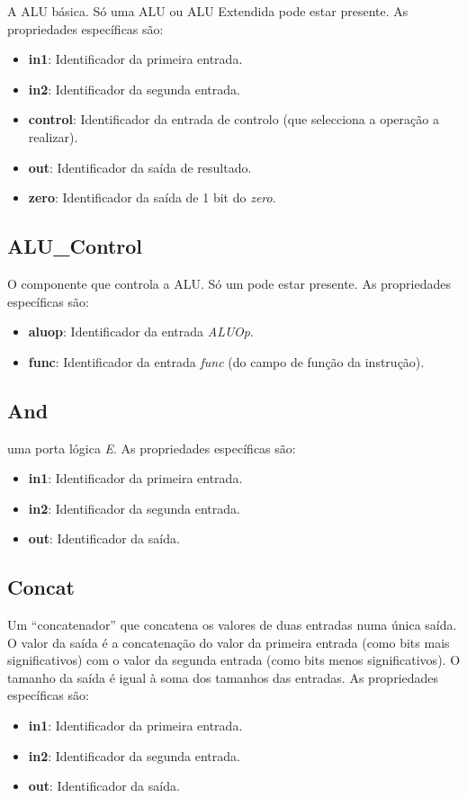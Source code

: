 \documentclass[11pt,a4paper,twoside,titlepage]{report}
\begin{document}
A ALU básica. Só uma ALU ou ALU Extendida pode estar presente. As propriedades
específicas são:
\begin{itemize}
	\item \textbf{in1}: Identificador da primeira entrada.
	\item \textbf{in2}: Identificador da segunda entrada.
	\item \textbf{control}: Identificador da entrada de controlo (que selecciona
		a operação a realizar).
	\item \textbf{out}: Identificador da saída de resultado.
	\item \textbf{zero}: Identificador da saída de 1 bit do \emph{zero}.
\end{itemize}

\subsection{ALU\_Control}

O componente que controla a ALU. Só um pode estar presente.
As propriedades específicas são:
\begin{itemize}
	\item \textbf{aluop}: Identificador da entrada \textit{ALUOp}.
	\item \textbf{func}: Identificador da entrada \emph{func} (do campo de função
		da instrução).
\end{itemize}

\subsection{And}

uma porta lógica \emph{E}. As propriedades específicas são:
\begin{itemize}
	\item \textbf{in1}: Identificador da primeira entrada.
	\item \textbf{in2}: Identificador da segunda entrada.
	\item \textbf{out}: Identificador da saída.
\end{itemize}

\subsection{Concat}

Um ``concatenador'' que concatena os valores de duas entradas numa única saída.
O valor da saída é a concatenação do valor da primeira entrada (como bits mais
significativos) com o valor da segunda entrada (como bits menos significativos).
O tamanho da saída é igual à soma dos tamanhos das entradas.
As propriedades específicas são:
\begin{itemize}
	\item \textbf{in1}: Identificador da primeira entrada.
	\item \textbf{in2}: Identificador da segunda entrada.
	\item \textbf{out}: Identificador da saída.
\end{itemize}
\end{document}
